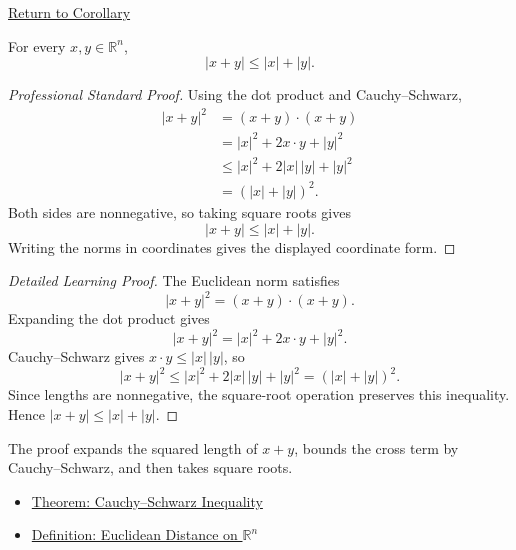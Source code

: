 \newpage
{}
\label{prf:minkowski-inequality-rn}

\begin{remark*}[Return]
\hyperref[cor:minkowski-inequality-rn]{Return to Corollary}
\end{remark*}

\begin{corollary*}
For every \(x,y\in\mathbb{R}^n\),
\[
  |x+y|\leq |x|+|y|.
\]
\end{corollary*}

\begin{proof}[Professional Standard Proof]
\LRAProofBodyStart
Using the dot product and Cauchy--Schwarz,
\[
\begin{aligned}
|x+y|^2
  &= (x+y)\cdot(x+y) \\
  &= |x|^2+2x\cdot y+|y|^2 \\
  &\leq |x|^2+2|x|\,|y|+|y|^2 \\
  &= (|x|+|y|)^2.
\end{aligned}
\]
Both sides are nonnegative, so taking square roots gives
\[
  |x+y|\leq |x|+|y|.
\]
Writing the norms in coordinates gives the displayed coordinate form.
\end{proof}

\begin{proof}[Detailed Learning Proof]
\LRAProofBodyStart
The Euclidean norm satisfies
\[
  |x+y|^2=(x+y)\cdot(x+y).
\]
Expanding the dot product gives
\[
  |x+y|^2=|x|^2+2x\cdot y+|y|^2.
\]
Cauchy--Schwarz gives \(x\cdot y\leq |x|\,|y|\), so
\[
  |x+y|^2\leq |x|^2+2|x|\,|y|+|y|^2=(|x|+|y|)^2.
\]
Since lengths are nonnegative, the square-root operation preserves this
inequality.  Hence \( |x+y|\leq |x|+|y| \).
\end{proof}

\begin{remark*}
The proof expands the squared length of \(x+y\), bounds the cross term by
Cauchy--Schwarz, and then takes square roots.
\end{remark*}

\begin{dependencies}
\begin{itemize}
  \item \hyperref[thm:cauchy-schwarz-inequality]{Theorem: Cauchy--Schwarz Inequality}
  \item \hyperref[def:euclidean-distance-rn]{Definition: Euclidean Distance on \(\mathbb{R}^n\)}
\end{itemize}
\end{dependencies}

\clearpage
